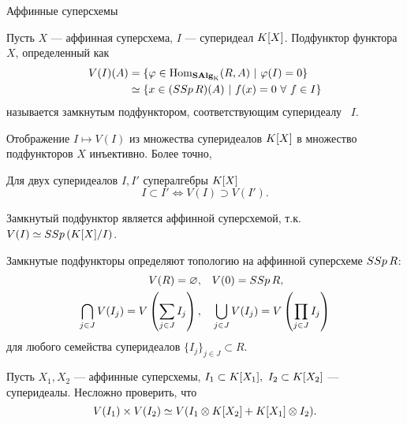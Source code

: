 \begin{subsection}{Аффинные суперсхемы}
  \begin{definition}
    Пусть $ X $ --- аффинная суперсхема, $ I $ --- суперидеал $ K[X]$.
    Подфунктор функтора $ X $, определенный как
    \begin{align*}
      V(I)(A) & = \{ \varphi \in \mathrm{Hom_{\mathbf{SAlg}_K}}(R, A) ~| ~\varphi(I) = 0 \} \\
              & \simeq \{ x \in (SSp\, R)(A) ~| ~f(x) = 0 ~\forall ~f \in I \}
    \end{align*}
    называется замкнутым подфунктором, соответствующим суперидеалу ~$ I $.
  \end{definition}
  Отображение $ I \mapsto V(I) $ из множества суперидеалов $ K[X] $ в множество
  подфункторов $ X $ инъективно. Более точно,
  \begin{proposition}
    Для двух суперидеалов $ I, I' $ супералгебры $ K[X] $
    \begin{equation}
      I \subset I' \iff V(I) \supset V(I').
    \end{equation}
  \end{proposition}
  
  Замкнутый подфунктор является аффинной суперсхемой, т.к.
  $ V(I) \simeq SSp\, (K[X] / I) $.

  Замкнутые подфункторы определяют топологию на аффинной суперсхеме $ SSp\, R $:
  \begin{align*}
    V(R) = \varnothing, & \quad
    V(0) = SSp\, R, \\
    \bigcap_{j \in J} V(I_j) = V \left(\sum_{j \in J} I_j \right), & \quad
    \bigcup_{j \in J} V(I_j) = V \left(\prod_{j \in J} I_j \right)
  \end{align*}
  для любого семейства суперидеалов $ \{I_j\}_{j \in J} \subset R $.

  Пусть $ X_1, X_2 $ --- аффинные суперсхемы,
  $ I_1 \subset K[X_1], ~I_2 \subset K[X_2] $ --- суперидеалы.
  Несложно проверить, что
  \begin{equation}
    V(I_1) \times V(I_2) \simeq V(I_1 \otimes K[X_2] + K[X_1] \otimes I_2).
  \end{equation}


\end{subsection}

